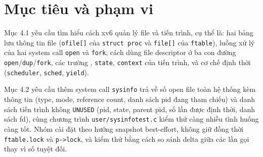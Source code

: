 \chapter{Mục tiêu và phạm vi}

\newpage

Mục 4.1 yêu cầu tìm hiểu cách xv6 quản lý file và tiến trình, cụ thể là: hai bảng lưu thông tin file (\texttt{ofile[]} của \texttt{struct proc} và \texttt{file[]} của \texttt{ftable}), luồng xử lý của hai system call \texttt{open} và \texttt{fork}, cách dùng file descriptor ở ba con đường \texttt{open}/\texttt{dup}/\texttt{fork}, các trường , \texttt{state}, \texttt{context} của tiến trình, và cơ chế định thời (\texttt{scheduler}, \texttt{sched}, \texttt{yield}).

Mục 4.2 yêu cầu thêm system call \texttt{sysinfo} trả về số open file toàn hệ thống kèm thông tin (type, mode, reference count, danh sách pid đang tham chiếu) và danh sách tiến trình không \texttt{UNUSED} (pid, state, parent pid, số lần được định thời, danh sách fd), cùng chương trình \texttt{user/sysinfotest.c} kiểm thử càng nhiều tình huống càng tốt. Nhóm cài đặt theo hướng snapshot best-effort, không giữ đồng thời \texttt{ftable.lock} và \texttt{p->lock}, và kiểm thử bằng cách so sánh delta giữa các lần gọi thay vì số tuyệt đối.


\vspace{0.5cm}

